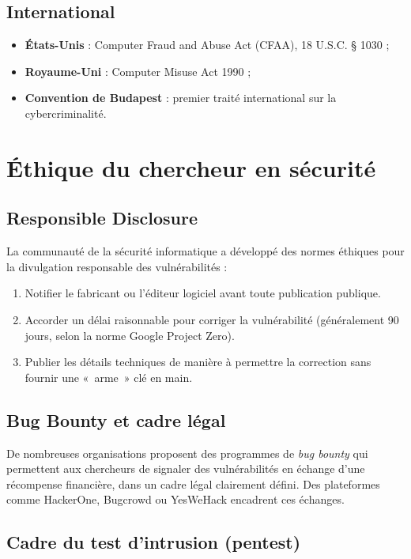 \documentclass[12pt,a4paper]{report}
\begin{document}
\subsection{International}

\begin{itemize}
  \item \textbf{États-Unis} : Computer Fraud and Abuse Act (CFAA), 18 U.S.C. § 1030 ;
  \item \textbf{Royaume-Uni} : Computer Misuse Act 1990 ;
  \item \textbf{Convention de Budapest} : premier traité international sur la cybercriminalité.
\end{itemize}

\section{Éthique du chercheur en sécurité}

\subsection{Responsible Disclosure}

La communauté de la sécurité informatique a développé des normes éthiques pour la divulgation responsable des vulnérabilités :

\begin{enumerate}
  \item Notifier le fabricant ou l'éditeur logiciel avant toute publication publique.
  \item Accorder un délai raisonnable pour corriger la vulnérabilité (généralement 90 jours, selon la norme Google Project Zero).
  \item Publier les détails techniques de manière à permettre la correction sans fournir une «~arme~» clé en main.
\end{enumerate}

\subsection{Bug Bounty et cadre légal}

De nombreuses organisations proposent des programmes de \textit{bug bounty} qui permettent aux chercheurs de signaler des vulnérabilités en échange d'une récompense financière, dans un cadre légal clairement défini. Des plateformes comme HackerOne, Bugcrowd ou YesWeHack encadrent ces échanges.

\subsection{Cadre du test d'intrusion (pentest)}
\end{document}
